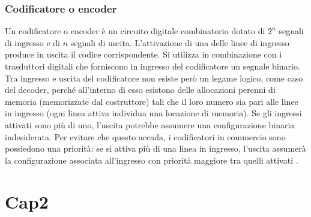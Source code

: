 \documentclass[a4paper]{report} %
\begin{document}
\subsection{Codificatore o encoder}
Un codificatore o encoder è un circuito digitale combinatorio dotato di $2^{n}$ segnali di ingresso e di $n$ segnali di uscita. L'attivazione di una delle linee di ingresso produce in uscita il codice corrispondente. Si utilizza in combinazione con i trasduttori digitali che forniscono in ingresso del codificatore un segnale binario. Tra ingresso e uscita del codificatore non esiste però un legame logico, come caso del decoder, perché all'interno di esso esistono delle allocazioni perenni di memoria (memorizzate dal costruttore) tali che il loro numero sia pari alle linee in ingresso (ogni linea attiva individua una locazione di memoria). Se gli ingressi attivati sono più di uno, l'uscita potrebbe assumere una configurazione binaria indesiderata. Per evitare che questo accada, i codificatori in commercio sono possiedono una priorità: se si attiva più di una linea in ingresso, l'uscita assumerà la configurazione associata all'ingresso con priorità maggiore tra quelli attivati \cite{art:rif.3}. 

\chapter{Cap2}
\end{document}
